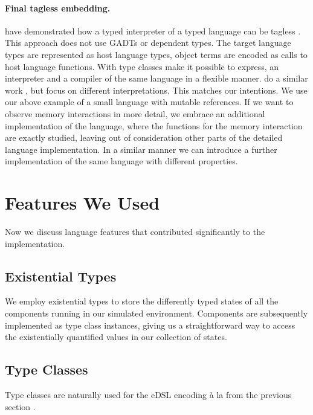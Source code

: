 \paragraph{Final tagless embedding.}
\citeauthor{final_tagless_embedding} have demonstrated how a typed interpreter of a typed language can be tagless \cite{final_tagless_embedding}.
This approach does not use GADTs or dependent types.
The target language types are represented as host language types, object terms are encoded as calls to host language functions. With type classes \citeauthor{final_tagless_embedding} make it possible to express, \eg an interpreter and a compiler of the same language in a flexible manner.
\citeauthor{Hofer:2008:PED:1449913.1449935} do a similar work \cite{Hofer:2008:PED:1449913.1449935}, but focus on different interpretations.
This matches our intentions.
We use our above example of a small language with mutable references.
If we want to observe memory interactions in more detail, we embrace an additional implementation of the language, where the functions for the memory interaction are exactly studied, leaving out of consideration other parts of the detailed language implementation.
In a similar manner we can introduce a further implementation of the same language with different properties.

\section{Features We Used}
\label{sec:impl-detail}
Now we discuss language features that contributed significantly to the
\soosim implementation.
\subsection{Existential Types}
We employ existential types to store the differently typed states of all the components running in our simulated environment.
Components are subsequently implemented as type class instances, giving us a straightforward way to access the existentially quantified values in our collection of states.

\subsection{Type Classes}
Type classes \cite{Hall:1996:TCH:227699.227700} are naturally used for
the eDSL encoding \`a la \citeauthor{final_tagless_embedding} from the
previous section \cite{final_tagless_embedding}.

